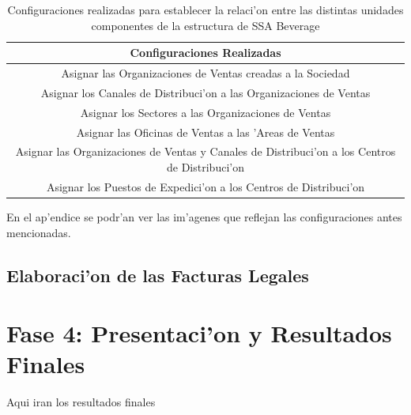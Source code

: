 \begin{table}[htb]
\footnotesize
\begin{tabular}{|c|}
\hline
\textbf{Configuraciones Realizadas}\\
\hline
 Asignar las Organizaciones de Ventas creadas a la Sociedad\\
\hline
Asignar los Canales de Distribuci'on a las Organizaciones de Ventas\\
\hline
Asignar los Sectores a las Organizaciones de Ventas \\
\hline
Asignar las Oficinas de Ventas a las 'Areas de Ventas\\
\hline
Asignar las Organizaciones de Ventas y Canales de Distribuci'on a los Centros de Distribuci'on\\
\hline
Asignar los Puestos de Expedici'on a los Centros de Distribuci'on\\
\hline
\end{tabular}
\caption{Configuraciones realizadas para establecer la relaci'on entre las distintas unidades componentes de la estructura de SSA Beverage}
\label{tb:asignaciones}
\end{table}
En el ap'endice se podr'an ver las im'agenes que reflejan las configuraciones antes mencionadas.
\subsection{Elaboraci'on de las Facturas Legales}

\section{Fase 4: Presentaci'on y Resultados Finales}
Aqui iran los resultados finales